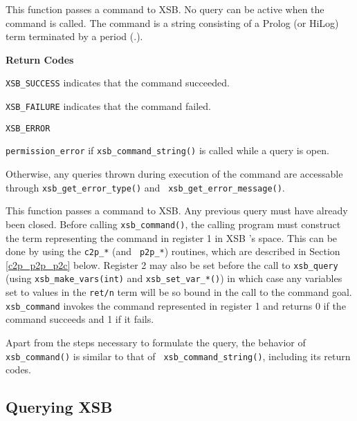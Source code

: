 \begin{description}
 
%
This function passes a command to XSB.  No query can be active when
the command is called.  The command is a string consisting of a Prolog
(or HiLog) term terminated by a period (.).

{\bf Return Codes}  
\bi
\item {\tt XSB\_SUCCESS} indicates that the command succeeded.
%
\item {\tt XSB\_FAILURE} indicates that the command failed.
%
\item {\tt XSB\_ERROR} 
\bi
\item {\tt permission\_error} if {\tt xsb\_command\_string()} is
  called while a query is open.
%
\item Otherwise, any queries thrown during execution of the command
  are accessable through {\tt xsb\_get\_error\_type()} and {\tt
    xsb\_get\_error\_message()}.
\ei
%
\ei

 
%
This function passes a command to XSB.  Any previous query must have
already been closed.  Before calling {\tt xsb\_command()}, the calling
program must construct the term representing the command in register 1
in XSB 's space.  This can be done by using the {\tt c2p\_*} (and {\tt
  p2p\_*}) routines, which are described in Section \ref{c2p_p2p_p2c}
below.  Register 2 may also be set before the call to {\tt xsb\_query}
(using {\tt xsb\_make\_vars(int)} and {\tt xsb\_set\_var\_*()}) in
which case any variables set to values in the {\tt ret/n} term will be
so bound in the call to the command goal.  {\tt xsb\_command} invokes
the command represented in register 1 and returns 0 if the command
succeeds and 1 if it fails. 

Apart from the steps necessary to formulate the query, the behavior of
{\tt xsb\_command()} is similar to that of {\tt
  xsb\_command\_string()}, including its return codes.
\end{description}

\subsection{Querying XSB}

